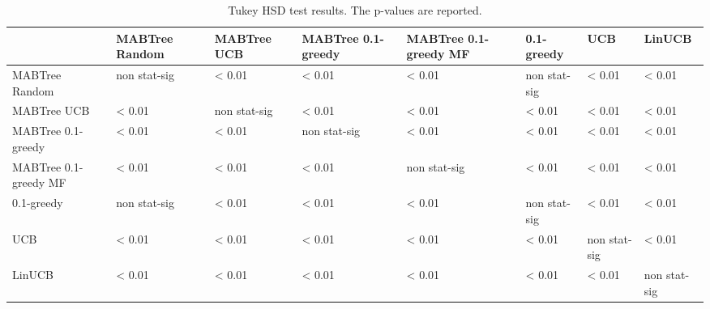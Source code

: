 \begin{table}[t]
\centering
\caption{Tukey HSD test results. The p-values are reported.}
\label{tab:tukey_hsd}
\begin{tabular}{llllllll}
\toprule
 & MABTree Random & MABTree UCB & MABTree
0.1-greedy & MABTree
0.1-greedy MF & 0.1-greedy & UCB & LinUCB \\
\midrule
MABTree Random & non stat-sig & < 0.01 & < 0.01 & < 0.01 & non stat-sig & < 0.01 & < 0.01 \\
MABTree UCB & < 0.01 & non stat-sig & < 0.01 & < 0.01 & < 0.01 & < 0.01 & < 0.01 \\
MABTree
0.1-greedy & < 0.01 & < 0.01 & non stat-sig & < 0.01 & < 0.01 & < 0.01 & < 0.01 \\
MABTree
0.1-greedy MF & < 0.01 & < 0.01 & < 0.01 & non stat-sig & < 0.01 & < 0.01 & < 0.01 \\
0.1-greedy & non stat-sig & < 0.01 & < 0.01 & < 0.01 & non stat-sig & < 0.01 & < 0.01 \\
UCB & < 0.01 & < 0.01 & < 0.01 & < 0.01 & < 0.01 & non stat-sig & < 0.01 \\
LinUCB & < 0.01 & < 0.01 & < 0.01 & < 0.01 & < 0.01 & < 0.01 & non stat-sig \\
\bottomrule
\end{tabular}
\end{table}
